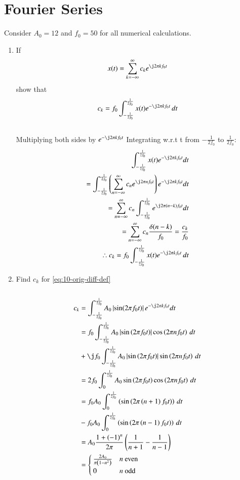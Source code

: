 \documentclass[journal,12pt,twocolumn]{IEEEtran}
\renewcommand\thesection{\arabic{section}}
\begin{document}
\section{Fourier Series}
Consider $A_0 =12$ and $f_0 = 50$ for all numerical calculations.
\begin{enumerate}[label=\thesection.\arabic*,ref=\thesection.\theenumi]
\item If
\begin{align}
	x(t) = \sum_{k = -\infty}^{\infty}c_ke^{\j2\pi kf_0 t}
\label{eq:one-Z-complex}
\end{align}
show that 
\begin{align}
	c_k = f_0\int_{-\frac{1}{2f_0}}^{\frac{1}{2f_0}}x(t)e^{-\j2\pi kf_0 t}\, dt
\label{eq:one-Z}
\end{align}
\solution\\
Multiplying both sides by $e^{-\j2\pi kf_0 t}$ Integrating w.r.t t from $-\frac{1}{2f_0}$ to ${\frac{1}{2f_0}}$:
\begin{align}
	\int_{-\frac{1}{2f_0}}^{\frac{1}{2f_0}}x(t)e^{-\j2\pi kf_0 t} dt\\
	 = \int_{-\frac{1}{2f_0}}^{\frac{1}{2f_0}} \brak{\sum_{n = -\infty}^{\infty}c_ne^{\j2\pi nf_0 t}}e^{-\j2\pi kf_0 t} dt\\
	 = \sum_{n = -\infty}^{\infty}c_n\int_{-\frac{1}{2f_0}}^{\frac{1}{2f_0}} e^{\j2\pi (n-k)f_0 t} dt\\
	 =\sum_{n = -\infty}^{\infty}c_n \frac{\delta(n-k)}{f_0}
	 =\frac{c_k}{f_0}\\
	\therefore c_k = f_0\int_{-\frac{1}{2f_0}}^{\frac{1}{2f_0}}x(t)e^{-\j2\pi kf_0 t}\, dt
\end{align}


\item Find $c_k$ for 
	\eqref{eq:10-orig-diff-def}\\
\solution\\
\begin{align}
	c_k &= \int_{-\frac{1}{2f_0}}^{\frac{1}{2f_0}} A_0 \abs{\sin(2\pi f_0 t)}e^{-\j2\pi kf_0 t} dt\\
	&= f_0\int_{-\frac{1}{2f_0}}^{\frac{1}{2f_0}}A_0\abs{\sin\brak{2\pi f_0t}}
	\cos\brak{2\pi nf_0t}\, dt \nonumber \\
	&+ \j f_0\int_{-\frac{1}{2f_0}}^{\frac{1}{2f_0}}A_0
	\abs{\sin\brak{2\pi f_0t}}\sin\brak{2\pi nf_0t}\, dt \\
	&= 2f_0\int_{0}^{\frac{1}{2f_0}}A_0\sin\brak{2\pi f_0t}\cos\brak{2\pi nf_0t}\, dt \\
	&= f_0A_0\int_{0}^{\frac{1}{2f_0}}\brak{\sin\brak{2\pi\brak{n+1}f_0t}}\, dt \nonumber \\ 
	&- f_0A_0\int_{0}^{\frac{1}{2f_0}}\brak{\sin\brak{2\pi\brak{n-1}f_0t}}\, dt \\ 
	&= A_0\frac{1+\brak{-1}^n}{2\pi}\brak{\frac{1}{n+1} - \frac{1}{n-1}} \\
	&= 
	\begin{cases}
		\frac{2A_0}{\pi\brak{1-n^2}} & n\ \text{even} \\
		0 & n\ \text{odd}
	\end{cases}
	\label{eq:ck-xt}
\end{align}
	

\end{enumerate}
\end{document}
